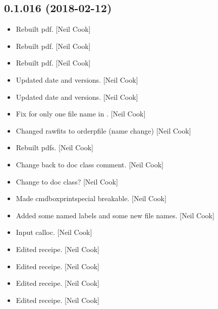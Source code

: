 \documentclass[a4paper,10pt,english]{report}
\begin{document}
\subsection{0.1.016 (2018-02-12)}
\label{\detokenize{misc/changelog:id487}}\begin{itemize}
\item {} 
Rebuilt pdf. {[}Neil Cook{]}

\item {} 
Rebuilt pdf. {[}Neil Cook{]}

\item {} 
Rebuilt pdf. {[}Neil Cook{]}

\item {} 
Updated date and versions. {[}Neil Cook{]}

\item {} 
Updated date and versions. {[}Neil Cook{]}

\item {} 
Fix for only one file name in . {[}Neil Cook{]}

\item {} 
Changed rawfits to orderpfile (name change) {[}Neil Cook{]}

\item {} 
Rebuilt pdfs. {[}Neil Cook{]}

\item {} 
Change back to doc class comment. {[}Neil Cook{]}

\item {} 
Change to doc class? {[}Neil Cook{]}

\item {} 
Made cmdboxprintspecial breakable. {[}Neil Cook{]}

\item {} 
Added some named labels and some new file names. {[}Neil Cook{]}

\item {} 
Input calloc. {[}Neil Cook{]}

\item {} 
Edited receipe. {[}Neil Cook{]}

\item {} 
Edited receipe. {[}Neil Cook{]}

\item {} 
Edited receipe. {[}Neil Cook{]}

\item {} 
Edited receipe. {[}Neil Cook{]}

\end{itemize}
\end{document}
